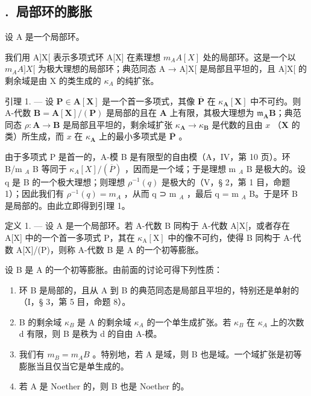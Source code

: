 \subsection*{\theappendixitem.\ 局部环的膨胀}
{}

设 A 是一个局部环。

我们用 A{]}X{[} 表示多项式环 A{[}X{]} 在素理想 \(m_{A}A[X]\) 处的局部环。这是一个以 \(m_{A}A{]}X{[}\) 为极大理想的局部环；典范同态 A → A{]}X{[} 是局部且平坦的，且 A{]}X{[} 的剩余域是由 X 的类生成的 \(\kappa_{A}\) 的纯扩张。

引理 1. — 设 \(\mathbf{P} \in \mathbf{A}[\mathbf{X}]\) 是一个首一多项式，其像 \(\overline{\mathbf{P}}\) 在 \(\kappa_{\mathbf{A}}[\mathbf{X}]\) 中不可约。则 A-代数 \(\mathbf{B} = \mathbf{A}[\mathbf{X}] / (\mathbf{P})\) 是局部的且在 \(\mathbf{A}\) 上有限，其极大理想为 \(\mathfrak{m}_{\mathbf{A}}\mathbf{B}\)；典范同态 \(\rho: \mathbf{A} \to \mathbf{B}\) 是局部且平坦的，剩余域扩张 \(\kappa_{\mathbf{A}} \to \kappa_{\mathbf{B}}\) 是代数的且由 \(x\) （\(\mathbf{X}\) 的类）所生成，而 \(x\) 在 \(\kappa_{\mathbf{A}}\) 上的最小多项式是 \(\overline{\mathbf{P}}\) 。

由于多项式 P 是首一的，A-模 B 是有限型的自由模（A，IV，第 10 页）。环 B/m \(_{A}\) B 等同于 \(\kappa_{A}[X]/(\overline{P})\) ，因而是一个域；于是理想 m \(_{A}\) B 是极大的。设 q 是 B 的一个极大理想；则理想 \(\rho^{-1}(q)\) 是极大的（V，§ 2，第 1 目，命题 1）；因此我们有 \(\rho^{-1}(q)=m_{A}\) ，从而 q ⊃ m \(_{A}\) ，最后 q = m \(_{A}\) B。于是环 B 是局部的。由此立即得到引理 1。

定义 1. --- 设 A 是一个局部环。若 A-代数 B 同构于 A-代数 A{]}X{[}，或者存在 A{[}X{]} 中的一个首一多项式 P，其在 \(\kappa_{\mathrm{A}}[\mathrm{X}]\) 中的像不可约，使得 B 同构于 A-代数 A{[}X{]}/(P)，则称 A-代数 B 是 A 的一个初等膨胀。

设 B 是 A 的一个初等膨胀。由前面的讨论可得下列性质：

\begin{enumerate}
\def\labelenumi{\alph{enumi})}
\item
  环 B 是局部的，且从 A 到 B 的典范同态是局部且平坦的，特别还是单射的（I，§ 3，第 5 目，命题 8）。
\item
  B 的剩余域 \(\kappa_{B}\) 是 A 的剩余域 \(\kappa_{A}\) 的一个单生成扩张。若 \(\kappa_{B}\) 在 \(\kappa_{A}\) 上的次数 d 有限，则 B 是秩为 d 的自由 A-模。
\item
  我们有 \(m_{B} = m_{A}B\) 。特别地，若 A 是域，则 B 也是域。一个域扩张是初等膨胀当且仅当它是单生成的。
\item
  若 A 是 Noether 的，则 B 也是 Noether 的。
\end{enumerate}

